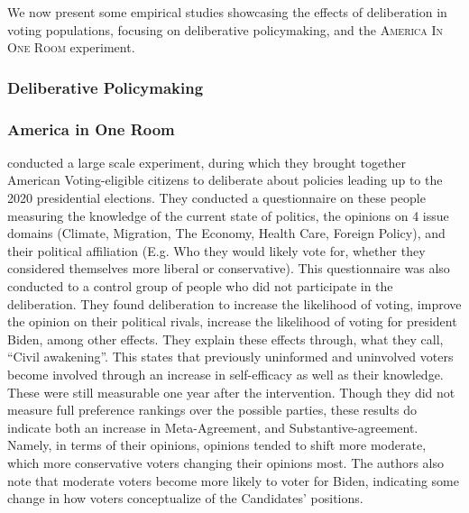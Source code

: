 We now present some empirical studies showcasing the effects of deliberation in
voting populations, focusing on deliberative policymaking, and the
\textsc{America In One Room} experiment.

\subsubsection{Deliberative Policymaking}

\subsubsection{America in One Room}\label{sub:americainonroom} \citet{fishkinCanDeliberationHave2024}
conducted a large scale experiment, during which they brought together American
Voting-eligible citizens to deliberate about policies leading up to the 2020
presidential elections. They conducted a questionnaire on these people
measuring the knowledge of the current state of politics, the opinions on 4
issue domains (Climate, Migration, The Economy, Health Care, Foreign Policy), and
their political affiliation (E.g. Who they would likely vote for, whether they
considered themselves more liberal or conservative). This questionnaire was
also conducted to a control group of people who did not participate in the
deliberation. They found deliberation to increase the likelihood of voting,
improve the opinion on their political rivals, increase the likelihood of
voting for president Biden, among other effects. They explain these effects
through, what they call, ``Civil awakening''. This states that previously
uninformed and uninvolved voters become involved through an increase in
self-efficacy as well as their knowledge. These were still measurable one year
after the intervention. Though they did not measure full preference rankings
over the possible parties, these results do indicate both an increase in
Meta-Agreement, and Substantive-agreement. Namely, in terms of their opinions,
opinions tended to shift more moderate, which more conservative voters changing
their opinions most. The authors also note that moderate voters become more
likely to voter for Biden, indicating some change in how voters conceptualize
of the Candidates' positions.


